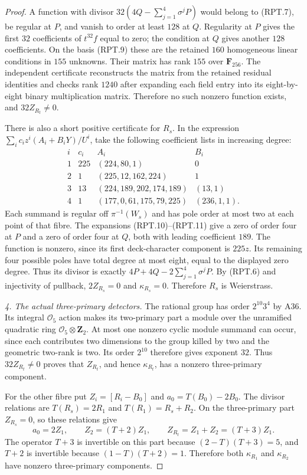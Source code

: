 \documentclass[11pt,a4paper]{article}
\begin{document}
\begin{proof}
A function with divisor
$32(4Q-\sum_{j=1}^4\sigma^jP)$ would belong to (RPT.7), be
regular at $P$, and vanish to order at least $128$ at $Q$.
Regularity at $P$ gives the first $32$ coefficients of
$t^{32}f$ equal to zero; the condition at $Q$ gives another
$128$ coefficients. On the basis (RPT.9) these are the
retained $160$ homogeneous linear conditions in $155$
unknowns. Their matrix has rank $155$ over $\mathbf F_{256}$.
The independent certificate reconstructs the matrix from the
retained residual identities and checks rank $1240$ after
expanding each field entry into its eight-by-eight binary
multiplication matrix. Therefore no such nonzero function
exists, and $32Z_{R_t}\ne0$.

There is also a short positive certificate for $R_s$.
In the expression $\sum_i c_i z^i(A_i+B_iY)/U^i$, take
the following coefficient lists in increasing degree:
\[
\begin{array}{c|c|l|l}
 i&c_i&A_i&B_i\\\hline
 1&225&(224,80,1)&0\\
 2&1&(225,12,162,224)&1\\
 3&13&(224,189,202,174,189)&(13,1)\\
 4&1&(177,0,61,175,79,225)&(236,1,1).
\end{array}
 \tag{RPT.12}
\]
Each summand is regular off $\pi^{-1}(W_s)$ and has pole
order at most two at each point of that fibre. The expansions
(RPT.10)--(RPT.11) give a zero of order four at $P$ and a zero
of order four at $Q$, both with leading coefficient $189$.
The function is nonzero, since its first deck-character
component is $225z$. Its remaining four possible poles have
total degree at most eight, equal to the displayed zero
degree. Thus its divisor is exactly
$4P+4Q-2\sum_{j=1}^4\sigma^jP$.
By (RPT.6) and injectivity of pullback, $2Z_{R_s}=0$ and
$\kappa_{R_s}=0$. Therefore $R_s$ is Weierstrass.

\emph{4. The actual three-primary detectors.}
The rational group has order $2^{10}3^4$ by A36. Its integral
$\mathcal O_5$ action makes its two-primary part a module over
the unramified quadratic ring $\mathcal O_5\otimes\mathbf Z_2$.
At most one nonzero cyclic module summand can occur, since
each contributes two dimensions to the group killed by two
and the geometric two-rank is two. Its order $2^{10}$
therefore gives exponent $32$. Thus $32Z_{R_t}\ne0$ proves
that $Z_{R_t}$, and hence $\kappa_{R_t}$, has a nonzero
three-primary component.

For the other fibre put $Z_i=[R_i-B_0]$ and
$a_0=T(B_0)-2B_0$. The divisor relations are
$T(R_s)=2R_1$ and $T(R_1)=R_s+R_2$.
On the three-primary part $Z_{R_s}=0$, so these relations
give
\[
 a_0=2Z_1,\qquad Z_2=(T+2)Z_1,\qquad
                  Z_{R_t}=Z_1+Z_2=(T+3)Z_1.
 \tag{RPT.13}
\]
The operator $T+3$ is invertible on this part because
$(2-T)(T+3)=5$, and $T+2$ is invertible because
$(1-T)(T+2)=1$. Therefore both $\kappa_{R_1}$ and
$\kappa_{R_2}$ have nonzero three-primary components.


\end{proof}
\end{document}
